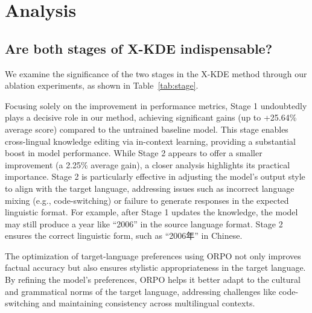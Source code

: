 \section{Analysis}
\subsection{Are both stages of X-KDE indispensable?}

We examine the significance of the two stages in the X-KDE method through our ablation experiments, as shown in Table~\ref{tab:stage}.
\begin{CJK*}{UTF8}{gbsn}
Focusing solely on the improvement in performance metrics, Stage 1 undoubtedly plays a decisive role in our method, achieving significant gains (up to +25.64\% average score) compared to the untrained baseline model. This stage enables cross-lingual knowledge editing via in-context learning, providing a substantial boost in model performance. While Stage 2 appears to offer a smaller improvement (a 2.25\% average gain), a closer analysis highlights its practical importance.
Stage 2 is particularly effective in adjusting the model’s output style to align with the target language, addressing issues such as incorrect language mixing (e.g., code-switching) or failure to generate responses in the expected linguistic format. For example, after Stage 1 updates the knowledge, the model may still produce a year like “2006” in the source language format. Stage 2 ensures the correct linguistic form, such as “2006年” in Chinese.
\end{CJK*}
The optimization of target-language preferences using ORPO not only improves factual accuracy but also ensures stylistic appropriateness in the target language. By refining the model’s preferences, ORPO helps it better adapt to the cultural and grammatical norms of the target language, addressing challenges like code-switching and maintaining consistency across multilingual contexts.

\begin{table}[ht]
\centering
{}
\caption{
\textbf{Ablation results on Bi-ZsRE benchmark} with Llama2-7b-chat as the base model. The \textit{en-avg} and \textit{zh-avg} columns denote average scores when editing in English or Chinese, respectively.
}
\vspace{-5pt}
\label{tab:stage}

\end{table}

